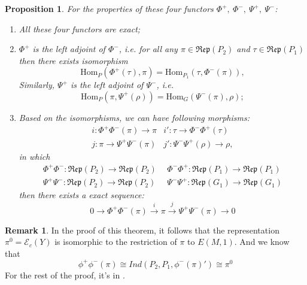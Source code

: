 \documentclass[12pt,a4paper,english]{article}
\theoremstyle{plain}
\newtheorem{prop}[thm]{Proposition}
\theoremstyle{definition}
\newtheorem*{rem}{Remark}
\begin{document}
\begin{prop}
For the properties of these four functors $\Phi^{+},\ \Phi^{-},\ \Psi^{+}, \ \Psi^{-}$:
\begin{enumerate}
    \item All these four functors are exact;
    \item $\Phi^{+}$ is the left adjoint of $\Phi^{-}$, i.e. for all any $\pi\in\mathfrak{Rep}(P_{2})$ and $\tau\in \mathfrak{Rep}(P_{1})$ then there exists isomorphism 
    \begin{equation*}
        \text{Hom}_{P}(\Phi^{+}(\tau),\pi)=\text{Hom}_{P_{1}}(\tau,\Phi^{-}(\pi)),
    \end{equation*}
    Similarly, $\Psi^{+}$ is the left adjoint of $\Psi^{-}$, i.e. 
    \begin{equation*}
        \text{Hom}_{P}(\pi,\Psi^{+}(\rho))=\text{Hom}_{G}(\Psi^{-}(\pi),\rho);
    \end{equation*}
    \item Based on the isomorphisms, we can have following morphisms: 
\begin{align*}
    i: \Phi^{+}\Phi^{-}(\pi)\rightarrow  \pi & i':\tau\rightarrow \Phi^{-}\Phi^{+}(\tau)\\
    j: \pi\rightarrow \Psi^{+}\Psi^{-}(\pi)& j':\Psi^{-}\Psi^{+}(\rho)\rightarrow \rho,
\end{align*}
in which 
\begin{align*}
    \Phi^{+}\Phi^{-}:\mathfrak{Rep}(P_{2})\rightarrow \mathfrak{Rep}(P_{2})\ \  & \Phi^{-}\Phi^{+}:\mathfrak{Rep}(P_{1})\rightarrow \mathfrak{Rep}(P_{1})\\
    \Psi^{+}\Psi^{-}: \mathfrak{Rep}(P_{2})\rightarrow \mathfrak{Rep}(P_{2})\ \ & \Psi^{-}\Psi^{+}: \mathfrak{Rep}(G_{1})\rightarrow \mathfrak{Rep}(G_{1})
\end{align*}
then there exists a exact sequence:
\begin{equation*}
    0\rightarrow \Phi^{+}\Phi^{-}(\pi)\xrightarrow{i}\pi \xrightarrow{j} \Psi^{+}\Psi^{-}(\pi)\rightarrow 0
\end{equation*}
\end{enumerate}

\end{prop}
\begin{rem}\label{BZ}
In the proof of this theorem, it follows that the representation $\pi^{0}=\mathcal{E}_{c}(Y)$ is isomorphic to the restriction of $\pi$ to $E(M,1)$. And we know that 
\begin{equation*}
    \phi^{+}\phi^{-}(\pi)\cong Ind(P_{2},P_{1},\phi^{-}(\pi)')\cong\pi^{0}
\end{equation*}
For the rest of the proof, it's in \cite{bernstein1976representations}.

\end{rem}
\end{document}
